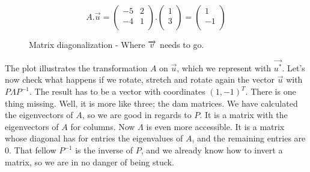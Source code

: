 \documentclass[a4,12pt,twosided,openany]{memoir}
\begin{document}
\[A.\overrightarrow{u} = \begin{pmatrix}
-5 & 2 \\
-4 & 1 \\
\end{pmatrix}.\begin{pmatrix}
1 \\
3  \\
\end{pmatrix} = \begin{pmatrix}
1 \\
-1  \\
\end{pmatrix}
\]
\begin{figure}[h!]
\begin{center}
\end{center}
\caption{Matrix diagonalization - Where $\protect\overrightarrow{v}$ needs to go.}
\end{figure}
\par 
\indent
The plot illustrates the transformation $A$ on $\overrightarrow{u}$, which we represent with $\overrightarrow{u^*}$. Let’s now check what happens if we rotate, stretch and rotate again the vector $\overrightarrow{u}$ with $P \Lambda P^{-1}$. The result has to be a vector with coordinates $(1,−1)^T$. There is one thing missing. Well, it is more like three; the dam matrices. We have calculated the eigenvectors of $A$, so we are good in regards to $P$. It is a matrix with the eigenvectors of $A$ for columns. Now $\Lambda$ is even more accessible. It is a matrix whose diagonal has for entries the eigenvalues of $A$, and the remaining entries are 0. That fellow $P^{-1}$ is the inverse of $P$, and we already know how to invert a matrix, so we are in no danger of being stuck.
\end{document}

